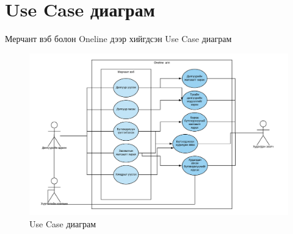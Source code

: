 \section{Use Case диаграм}
	Мерчант вэб болон Oneline дээр хийгдсэн Use Case диаграм
\begin{figure}
	\centering
	\includegraphics[width=15cm]{images/usecase-diagram.png}
	\caption{Use Case диаграм}
	\label{fig:form}
\end{figure}
